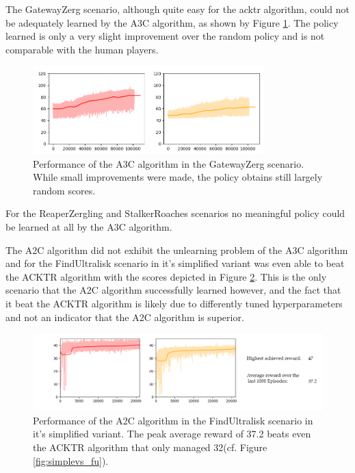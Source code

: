 The GatewayZerg scenario, although quite easy for the acktr algorithm, could not be adequately learned by the A3C algorithm, as shown by Figure \ref{fig:gz_a3c}. The policy learned is only a very slight improvement over the random policy and is not comparable with the human players.

\begin{figure}[htb]
  \centering
      \includegraphics[width=0.8\textwidth]{Figures/plots/gz_a3c.png}
  \caption{Performance of the A3C algorithm in the GatewayZerg scenario. While small improvements were made, the policy obtains still largely random scores.}
  \label{fig:gz_a3c}
\end{figure}

For the ReaperZergling and StalkerRoaches scenarios no meaningful policy could be learned at all by the A3C algorithm.

The A2C algorithm did not exhibit the unlearning problem of the A3C algorithm and for the FindUltralisk scenario in it's simplified variant was even able to beat the ACKTR algorithm with the scores depicted in Figure \ref{fig:a2c_fu}. This is the only scenario that the A2C algorithm successfully learned however, and the fact that it beat the ACKTR algorithm is likely due to differently tuned hyperparameters and not an indicator that the A2C algorithm is superior.

\begin{figure}[htb]
  \centering
      \includegraphics[width=1\textwidth]{Figures/plots/a2c_fu.png}
  \caption{Performance of the A2C algorithm in the FindUltralisk scenario in it's simplified variant. The peak average reward of 37.2 beats even the ACKTR algorithm that only managed 32(cf. Figure \ref{fig:simplevs_fu}). }
  \label{fig:a2c_fu}
\end{figure}

